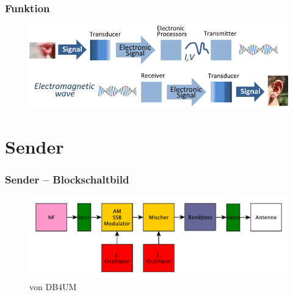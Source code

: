 \begin{frame}
  \frametitle{Funktion}
  \begin{center}
    \begin{figure}
      \includegraphics[width=1\textwidth,height=.75\textheight,keepaspectratio]{e15/TRX-superSimple.png}
    \end{figure}
  \end{center}
\end{frame}

\section*{Sender}

\begin{frame}
  \frametitle{Sender -- Blockschaltbild}
  \begin{center}
    \begin{figure}
      \includegraphics[width=1\textwidth,height=.75\textheight,keepaspectratio]{e15/ssb-trx-bsb.pdf}
      \caption{von DB4UM}
    \end{figure}
  \end{center}
\end{frame}

